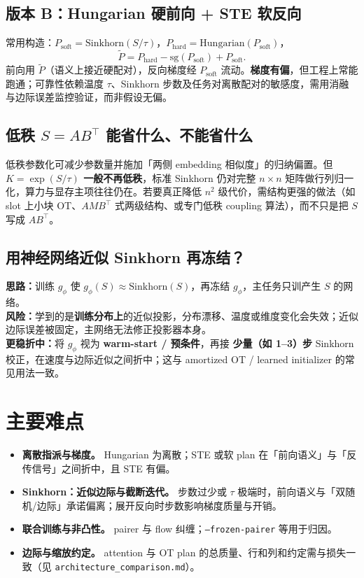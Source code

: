 \documentclass[UTF8]{ctexart}
\begin{document}
\subsection{版本 B：Hungarian 硬前向 + STE 软反向}

常用构造：$P_{\mathrm{soft}}=\mathrm{Sinkhorn}(S/\tau)$，$P_{\mathrm{hard}}=\mathrm{Hungarian}(P_{\mathrm{soft}})$，
\[
\tilde P = P_{\mathrm{hard}}-\mathrm{sg}(P_{\mathrm{soft}})+P_{\mathrm{soft}}.
\]
前向用 $\tilde P$（语义上接近硬配对），反向梯度经 $P_{\mathrm{soft}}$ 流动。\textbf{梯度有偏}，但工程上常能跑通；可靠性依赖温度 $\tau$、Sinkhorn 步数及任务对离散配对的敏感度，需用消融与边际误差监控验证，而非假设无偏。

\subsection{低秩 $S=AB^\top$ 能省什么、不能省什么}

低秩参数化可减少参数量并施加「两侧 embedding 相似度」的归纳偏置。但 \textbf{$K=\exp(S/\tau)$ 一般不再低秩}，标准 Sinkhorn 仍对完整 $n\times n$ 矩阵做行列归一化，算力与显存主项往往仍在。若要真正降低 $n^2$ 级代价，需结构更强的做法（如 slot 上小块 OT、$AMB^\top$ 式两级结构、或专门低秩 coupling 算法），而不只是把 $S$ 写成 $AB^\top$。

\subsection{用神经网络近似 Sinkhorn 再冻结？}

\textbf{思路：}训练 $g_\phi$ 使 $g_\phi(S)\approx \mathrm{Sinkhorn}(S)$，再冻结 $g_\phi$，主任务只训产生 $S$ 的网络。\\
\textbf{风险：}学到的是\textbf{训练分布上}的近似投影，分布漂移、温度或维度变化会失效；近似边际误差被固定，主网络无法修正投影器本身。\\
\textbf{更稳折中：}将 $g_\phi$ 视为 \textbf{warm-start / 预条件}，再接 \textbf{少量（如 1--3）步} Sinkhorn 校正，在速度与边际近似之间折中；这与 amortized OT / learned initializer 的常见用法一致。

\section{主要难点}

\begin{itemize}
  \item \textbf{离散指派与梯度。}
    Hungarian 为离散；STE 或软 plan 在「前向语义」与「反传信号」之间折中，且 STE 有偏。
  \item \textbf{Sinkhorn：近似边际与截断迭代。}
    步数过少或 $\tau$ 极端时，前向语义与「双随机/边际」承诺偏离；展开反向时步数影响梯度质量与开销。
  \item \textbf{联合训练与非凸性。}
    pairer 与 flow 纠缠；\texttt{--frozen-pairer} 等用于归因。
  \item \textbf{边际与缩放约定。}
    attention 与 OT plan 的总质量、行和列和约定需与损失一致（见 \texttt{architecture\_comparison.md}）。
\end{itemize}
\end{document}
